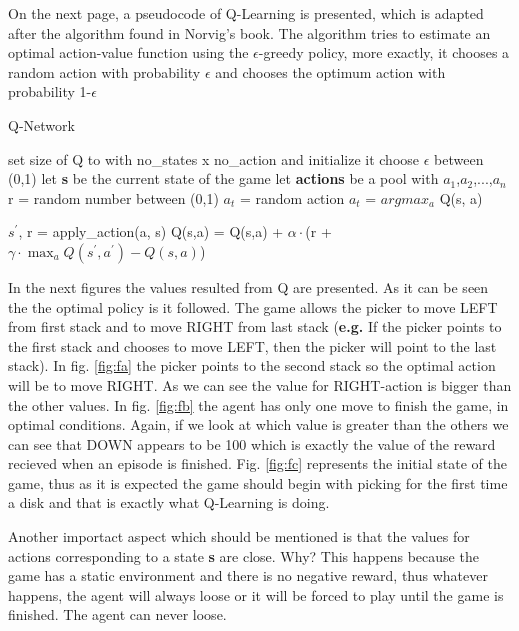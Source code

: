 On the next page, a pseudocode of Q-Learning is presented, which is adapted after the algorithm found in Norvig's book{\cite{norvig}}. The algorithm tries to estimate an optimal action-value function using the $\epsilon$-greedy policy, more exactly, it chooses a random action with probability $\epsilon$ and chooses the optimum action with probability 1-$\epsilon$
\newpage
\begin{algorithm}
	\caption{Q-Network} \label{alg-code}
	\begin{algorithmic}[1]
		\State set size of Q to with no_states x no_action and initialize it
		\State choose $\epsilon$ between (0,1)
		\State let \textbf{s} be the current state of the game
		\State let \textbf{actions} be a pool with {$a_1$,$a_2$,...,$a_n$}
			\State r = random number between (0,1)
				\State $a_t$ = random action
			\Else
				\State $a_t$ = $argmax_a$ Q(s, a)
			\EndIf
			
			\State $s^\prime$, r = apply_action(a, s)
			\State Q(s,a) = Q(s,a) + $\alpha\cdot$(r + $\gamma\cdot \max_a Q(s^\prime,a^\prime)-Q(s,a)$)
		\EndWhile
	\end{algorithmic}
\end{algorithm}

In the next figures the values resulted from Q are presented. As it can be seen the the optimal policy is it followed. The game allows the picker to move LEFT from first stack and to move RIGHT from last stack (\textbf{e.g.} If the picker points to the first stack and chooses to move LEFT, then the picker will point to the last stack). In fig. \ref{fig:fa} the picker points to the second stack so the optimal action will be to move RIGHT. As we can see the value for RIGHT-action is bigger than the other values. In fig. \ref{fig:fb} the agent has only one move to finish the game, in optimal conditions. Again, if we look at which value is greater than the others we can see that DOWN appears to be 100 which is exactly the value of the reward recieved when an episode is finished. Fig. \ref{fig:fc} represents the initial state of the game, thus as it is expected the game should begin with picking for the first time a disk and that is exactly what Q-Learning is doing.

Another importact aspect which should be mentioned is that the values for actions corresponding to a state \textbf{s} are close. Why? This happens because the game has a static environment and there is no negative reward, thus whatever happens, the agent will always loose or it will be forced to play until the game is finished. The agent can never loose.

